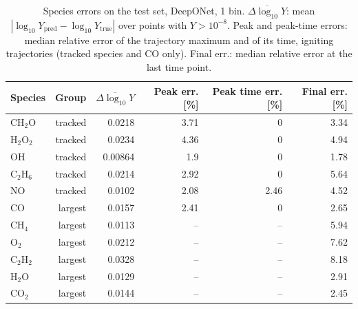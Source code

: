 \begin{table}[htbp]
    \centering
    \small
    \begin{tabular}{lrrrrr}
        \hline
        Species & Group & $\overline{\Delta\log_{10}Y}$ & Peak err. [\%] & Peak time err. [\%] & Final err. [\%] \\
        \hline
        $\mathrm{CH_{2}O}$ & tracked & 0.0218 & 3.71 & 0 & 3.34 \\
        $\mathrm{H_{2}O_{2}}$ & tracked & 0.0234 & 4.36 & 0 & 4.94 \\
        $\mathrm{OH}$ & tracked & 0.00864 & 1.9 & 0 & 1.78 \\
        $\mathrm{C_{2}H_{6}}$ & tracked & 0.0214 & 2.92 & 0 & 5.64 \\
        $\mathrm{NO}$ & tracked & 0.0102 & 2.08 & 2.46 & 4.52 \\
        $\mathrm{CO}$ & largest & 0.0157 & 2.41 & 0 & 2.65 \\
        $\mathrm{CH_{4}}$ & largest & 0.0113 & -- & -- & 5.94 \\
        $\mathrm{O_{2}}$ & largest & 0.0212 & -- & -- & 7.62 \\
        $\mathrm{C_{2}H_{2}}$ & largest & 0.0328 & -- & -- & 8.18 \\
        $\mathrm{H_{2}O}$ & largest & 0.0129 & -- & -- & 2.91 \\
        $\mathrm{CO_{2}}$ & largest & 0.0144 & -- & -- & 2.45 \\
        \hline
    \end{tabular}
    \caption{Species errors on the test set, DeepONet, 1 bin. $\overline{\Delta\log_{10}Y}$: mean $|\log_{10}Y_\mathrm{pred}-\log_{10}Y_\mathrm{true}|$ over points with $Y>10^{-8}$. Peak and peak-time errors: median relative error of the trajectory maximum and of its time, igniting trajectories (tracked species and CO only). Final err.: median relative error at the last time point.}
    \label{tab:species_deeponet_predicted_b1_conv}
\end{table}
